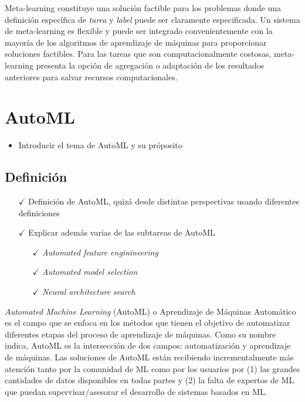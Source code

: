 Meta-learning constituye una solución factible para los problemas donde una definición específica de \textit{tarea} y \textit{label} puede ser claramente especificada. Un sistema de meta-learning es flexible y puede ser integrado convenientemente con la mayoría de los algoritmos de aprendizaje de máquinas para proporcionar soluciones factibles. Para las tareas que son computacionalmente costosas, meta-learning presenta la opción de agregación o adaptación de los resultados anteriores para salvar recursos computacionales.
 
\section{AutoML}\label{sec:automl}

\begin{itemize}
	\item Introducir el tema de AutoML y su próposito
\end{itemize}

\subsection{Definición}\label{subsec:automl_definition}


\begin{itemize}
	\item[$\checkmark$] Definición de AutoML, quizá desde distintas perspectivas usando diferentes definiciones
	\item[$\checkmark$] Explicar además varias de las subtareas de AutoML \begin{itemize}
		\item[$\checkmark$] \textit{Automated feature enginineering}
		\item[$\checkmark$] \textit{Automated model selection}
		\item[$\checkmark$] \textit{Neural architecture search}
	\end{itemize}
\end{itemize}

\textit{Automated Machine Learning} (AutoML) o Aprendizaje de Máquinas Automático es el campo que se enfoca en los métodos que tienen el objetivo de automatizar diferentes etapas del proceso de aprendizaje de máquinas. Como su nombre indica, AutoML es la intersección de dos campos: automatización y aprendizaje de máquinas. Las soluciones de AutoML están recibiendo incrementalmente más atención tanto por la comunidad de ML como por los usuarios por (1) las grandes cantidades de datos disponibles en todas partes y (2) la falta de expertos de ML que puedan supervisar/asesorar el desarrollo de sistemas basados en ML.

